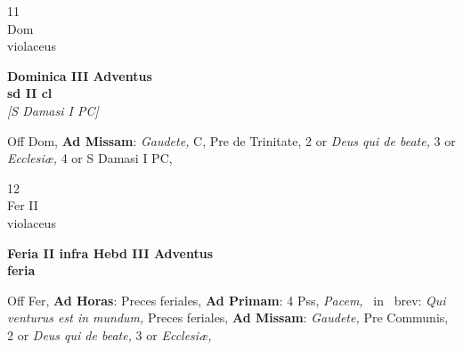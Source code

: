 \documentclass[10pt, openany]{book}
\begin{document}
        \begin{center}
            \begin{minipage}{3.5in}
                \vspace{2em}
                \begin{minipage}{0.5in}
                    {\Huge 11} \\
                    {\normalsize Dom} \\
                    {\normalsize violaceus}
                \end{minipage}
                \begin{minipage}{3.0in}
                    \textbf{ \large Dominica III Adventus \\
                    \textnormal{\normalsize sd II cl}} \\ \textit{[S Damasi I PC]} \\ 
                \end{minipage}
                \begin{justify}Off Dom, \textbf{Ad Missam}: \textit{Gaudete,} C, Pre de Trinitate, 2 or \textit{Deus qui de beate,} 3 or \textit{Ecclesiæ,} 4 or S Damasi I PC,   
                \end{justify}
            \end{minipage}
        \end{center}
    
        \begin{center}
            \begin{minipage}{3.5in}
                \vspace{2em}
                \begin{minipage}{0.5in}
                    {\Huge 12} \\
                    {\normalsize Fer II} \\
                    {\normalsize violaceus}
                \end{minipage}
                \begin{minipage}{3.0in}
                    \textbf{ \large Feria II infra Hebd III Adventus \\
                    \textnormal{\normalsize feria}} \\ 
                \end{minipage}
                \begin{justify}Off Fer, \textbf{Ad Horas}: Preces feriales, \textbf{Ad Primam}: 4 Pss, \textit{Pacem,} \Vbar\ in \Rbar\ brev: \textit{Qui venturus est in mundum,} Preces feriales, \textbf{Ad Missam}: \textit{Gaudete,} Pre Communis, 2 or \textit{Deus qui de beate,} 3 or \textit{Ecclesiæ,}   
                \end{justify}
            \end{minipage}
        \end{center}
    
\end{document}
